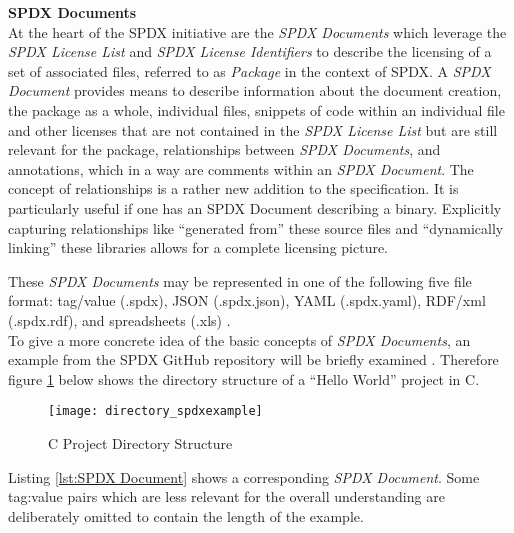 \noindent
\textbf{SPDX Documents}\\
At the heart of the SPDX initiative are the \textit{SPDX Documents} which leverage the \textit{SPDX License List} and \textit{SPDX License Identifiers} to describe the licensing of a set of associated files, referred to as \textit{Package} in the context of SPDX. A \textit{SPDX Document} provides means to describe information about the document creation, the package as a whole, individual files, snippets of code within an individual file and other licenses that are not contained in the \textit{SPDX License List} but are still relevant for the package, relationships between \textit{SPDX Documents}, and annotations, which in a way are comments within an \textit{SPDX Document}. The concept of relationships is a rather new addition to the specification. It is particularly useful if one has an SPDX Document describing a binary. Explicitly capturing relationships like \enquote{generated from} these source files and \enquote{dynamically linking} these libraries allows for a complete licensing picture. \par
These \emph{SPDX Documents} may be represented in one of the following five file format: tag/value (.spdx), JSON (.spdx.json), YAML (.spdx.yaml), RDF/xml (.spdx.rdf), and spreadsheets (.xls) \cite{SPDXWebsite, SPDXSpec}.\\

To give a more concrete idea of the basic concepts of \textit{SPDX Documents}, an example from the SPDX GitHub repository will be briefly examined \cite{SPDXExamples}. Therefore figure \ref{fig:C Project} below shows the directory structure of a \enquote{Hello World} project in C.

\begin{figure}[H]
	\centering
	\texttt{[image: directory\_spdxexample]}
	\caption[C Project Directory Structure]{C Project Directory Structure }
	\label{fig:C Project}
\end{figure}

Listing \ref{lst:SPDX Document} shows a corresponding \textit{SPDX Document}. Some tag:value pairs which are less relevant for the overall understanding are deliberately omitted to contain the length of the example.\\ 

